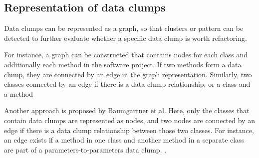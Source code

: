 \subsection{Representation of data clumps}\label{sec:data_clump_graph}

Data clumps can be represented as a graph, so that clusters or pattern can be detected to further evaluate whether a specific data clump is worth refactoring. 

For instance, a graph can be constructed that contains nodes for each class and additionally each method in the software project. If two methods form a data clump, they are connected by an edge in the graph representation. Similarly, two classes connected by an edge if there is a data clump relationship, or a class and a method   

Another approach is proposed by Baumgartner et al. Here, only the classes that contain data clumps are represented as nodes, and two nodes are connected by an edge if there is a data clump relationship between those two classes. For instance, an edge exists if a method in one class and another method in a separate class are part of a parameters-to-parameters data clump. \cite{data_clumps_baumgartner}.



